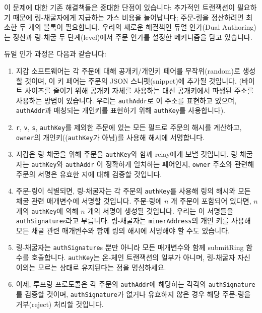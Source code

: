 \documentclass[UTF8,nofonts]{article}
\begin{document}
\begin{multicols}{2}
이 문제에 대한 기존 해결책들은 중대한 단점이 있습니다: 추가적인 트랜잭션이 필요하기 때문에 링-채굴자에게 지급하는 가스 비용을 늘어납니다; 주문-링을 정산하려면 최소한 두 개의 블록이 필요합니다. 우리의 새로운 해결책인 듀얼 인가(Dual Authoring)\cite{dualauthor}는 정산과 링-채굴 두 단계(level)에서 주문 인가를 설정한 메커니즘을 담고 있습니다.

듀얼 인가 과정은 다음과 같습니다:

\begin{enumerate}

	\item 지갑 소프트웨어는 각 주문에 대해 공개키/개인키 페어를 무작위(random)로 생성할 것이며, 이 키 페어는 주문의 JSON 스니펫(snippet)에 추가될 것입니다. (바이트 사이즈를 줄이기 위해 공개키 자체를 사용하는 대신 공개키에서 파생된 주소를 사용하는 방법이 있습니다. 우리는 \verb|authAddr|로 이 주소를 표현하고 있으며, \verb|authAddr|과 매칭되는 개인키를 표현하기 위해 \verb|authKey|를 사용합니다).

	\item \verb|r|, \verb|v|, \verb|s|, \verb|authKey|를 제외한 주문에 있는 모든 필드로 주문의 해시를 계산하고, \verb|owner|의 개인키((\verb|authKey|가 아님)를 사용해 해시에 서명합니다.

	\item 지갑은 링-채굴을 위해 주문을 \verb|authKey|와 함께 relay에게 보낼 것입니다. 링-채굴자는 \verb|authKey|와 \verb|authAddr| 이 정확하게 일치하는 페어인지, \verb|owner| 주소와 관련해 주문의 서명은 유효한 지에 대해 검증할 것입니다.

	\item 주문-링이 식별되면, 링-채굴자는 각 주문의 \verb|authKey|를 사용해 링의 해시와 모든 채굴 관련 매개변수에 서명할 것입니다. 주문-링에 $n$ 개 주문이 포함되어 있다면, $n$ 개의 \verb|authKey|에 의해 $n$ 개의 서명이 생성될 것입니다. 우리는 이 서명들을 \verb|authSignature|s라고 부릅니다. 링-채굴자는 \verb|minerAddress|의 개인 키를 사용해 모든 채굴 관련 매개변수와 함께 링의 해시에 서명해야 할 수도 있습니다.
 
	\item 링-채굴자는 \verb|authSignature|s 뿐만 아니라 모든 매개변수와 함께 submitRing 함수를 호출합니다. \verb|authKey|는 온-체인 트랜잭션의 일부가 아니며, 링-채굴자 자신 이외는 모르는 상태로 유지된다는 점을 명심하세요.

	\item 이제, 루프링 프로토콜은 각 주문의 \verb|authAddr|에 해당하는 각각의 \verb|authSignature|를 검증할 것이며, \verb|authSignature|가 없거나 유효하지 않은 경우 해당 주문-링을 거부(reject) 처리할 것입니다.
 

\end{enumerate}
\end{multicols}
\end{document}
